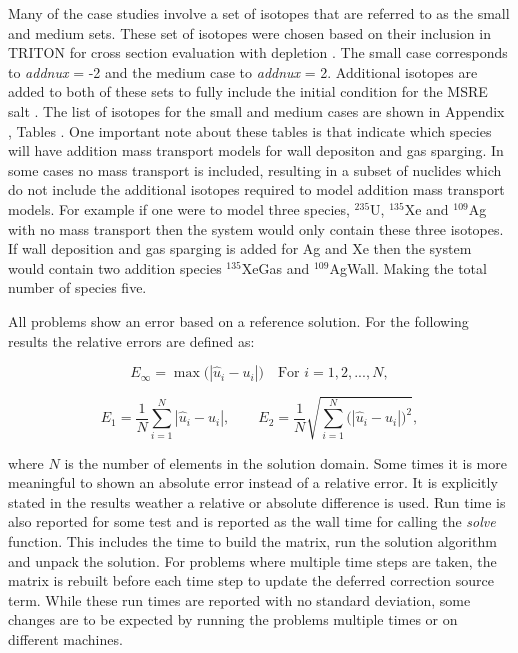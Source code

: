 Many of the case studies involve a set of isotopes that are referred to as the small and medium sets. These set of isotopes were chosen based on their inclusion in TRITON for cross section evaluation with depletion \cite{scaleManual}. The small case corresponds to \textit{addnux} = -2 and the medium case to \textit{addnux} = 2. Additional isotopes are added to both of these sets to fully include the initial condition for the MSRE salt \cite{MSREbenchmark}. The list of isotopes for the small and medium cases are shown in Appendix , Tables  . One important note about these tables is that indicate which species will have addition mass transport models for wall depositon and gas sparging. In some cases no mass transport is included, resulting in a subset of nuclides which do not include the additional isotopes required to model addition mass transport models. For example if one were to model three species, ${}^{235}$U, ${}^{135}$Xe and ${}^{109}$Ag with no mass transport then the system would only contain these three isotopes. If wall deposition and gas sparging is added for Ag and Xe then the system would contain two addition species ${}^{135}$XeGas and ${}^{109}$AgWall. Making the total number of species five. 

All problems show an error based on a reference solution. For the following results the relative errors are defined as:

\begin{equation*}
    E_{\infty} = \max\bigg(|\hat{u}_{i} - u_{i}|\bigg) \quad \text{For } i = 1, 2, ..., N,
\end{equation*}

\begin{equation*}
    E_{1} = \frac{1}{N}\sum_{i=1}^{N}|\hat{u}_{i} - u_{i}|, \quad \quad E_{2} = \frac{1}{N}\sqrt{\sum_{i=1}^{N}\bigg(|\hat{u}_{i} - u_{i}|\bigg)^{2}},
\end{equation*}

\noindent where $N$ is the number of elements in the solution domain. Some times it is more meaningful to shown an absolute error instead of a relative error. It is explicitly stated in the results weather a relative or absolute difference is used. Run time is also reported for some test and is reported as the wall time for calling the \textit{solve} function. This includes the time to build the matrix, run the solution algorithm and unpack the solution. For problems where multiple time steps are taken, the matrix is rebuilt before each time step to update the deferred correction source term. While these run times are reported with no standard deviation, some changes are to be expected by running the problems multiple times or on different machines. 

